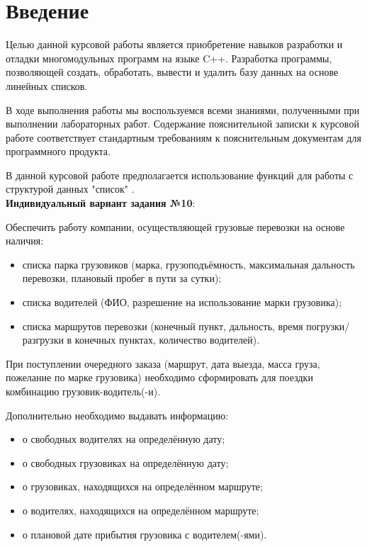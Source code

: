 \section{Введение}

Целью данной курсовой работы является приобретение навыков разработки и 
отладки многомодульных программ на языке C++. 
Разработка программы, позволяющей 
создать,
обработать, 
вывести 
и удалить 
базу данных на основе линейных списков.

В ходе выполнения работы мы воспользуемся всеми знаниями, 
полученными при выполнении лабораторных работ.
Содержание пояснительной записки к курсовой работе 
соответствует стандартным требованиям к пояснительным 
документам для программного продукта.

В данной курсовой работе предполагается использование функций для
работы с структурой данных "список" \cite{list_defenition}. \\

\textbf{Индивидуальный вариант задания №10}:

Обеспечить работу компании, осуществляющей грузовые
перевозки на основе наличия:

\begin{itemize}
    \item списка парка грузовиков (марка, грузоподъёмность, максимальная
    дальность перевозки, плановый пробег в пути за сутки);
    \item списка водителей (ФИО, разрешение на использование марки грузовика);
    \item списка маршрутов перевозки (конечный пункт, дальность, время
    погрузки/разгрузки в конечных пунктах, количество водителей).
\end{itemize}

При поступлении очередного заказа (маршрут, дата выезда, масса груза,
пожелание по марке грузовика) необходимо сформировать для поездки
комбинацию грузовик-водитель(-и).

Дополнительно необходимо выдавать информацию:

\begin{itemize}
    \item о свободных водителях на определённую дату;
    \item о свободных грузовиках на определённую дату;
    \item о грузовиках, находящихся на определённом маршруте;
    \item о водителях, находящихся на определённом маршруте;
    \item о плановой дате прибытия грузовика с водителем(-ями).
    
\end{itemize}
